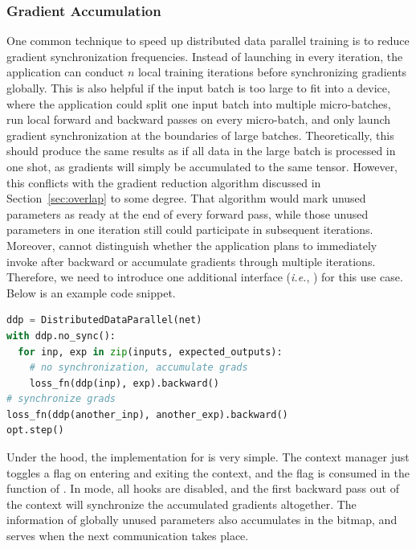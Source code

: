 \subsubsection{Gradient Accumulation}\label{sec:accumulation}

One common technique to speed up distributed data parallel training is to reduce gradient synchronization frequencies. Instead of launching  in every iteration, the application can conduct $n$ local training iterations before synchronizing gradients globally. This is also helpful if the input batch is too large to fit into a device, where the application could split one input batch into multiple micro-batches, run local forward and backward passes on every micro-batch, and only launch gradient synchronization at the boundaries of large batches. Theoretically, this should produce the same results as if all data in the large batch is processed in one shot, as gradients will simply be accumulated to the same tensor. However, this conflicts with the gradient reduction algorithm discussed in Section~\ref{sec:overlap} to some degree. That algorithm would mark unused parameters as ready at the end of every forward pass, while those unused parameters in one iteration still could participate in subsequent iterations. Moreover,  cannot distinguish whether the application plans to immediately invoke  after backward or accumulate gradients through multiple iterations. Therefore, we need to introduce one additional interface (\emph{i.e.}, ) for this use case. Below is an example code snippet.
\begin{lstlisting}[language=Python]
ddp = DistributedDataParallel(net)
with ddp.no_sync():
  for inp, exp in zip(inputs, expected_outputs):
    # no synchronization, accumulate grads
    loss_fn(ddp(inp), exp).backward()  
# synchronize grads
loss_fn(ddp(another_inp), another_exp).backward()  
opt.step()
\end{lstlisting}
Under the hood, the implementation for  is very simple. The context manager just toggles a flag on entering and exiting the context, and the flag is consumed in the  function of . In  mode, all  hooks are disabled, and the first backward pass out of the context will synchronize the accumulated gradients altogether. The information of globally unused parameters also accumulates in the bitmap, and serves when the next communication takes place.